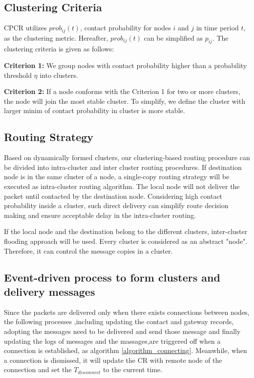 \subsection{Clustering Criteria}
CPCR utilizes $prob_{ij}(t)$, contact probability for nodes $i$ and $j$ in time period $t$, as the clustering metric. Hereafter, $prob_{ij}(t)$ can be simplified as $p_{ij}$. The clustering criteria is given as follows:

  \textbf{Criterion 1:} We group nodes with contact probability higher than a probability threshold $\eta$ into clusters.

  \textbf{Criterion 2:} If a node conforms with the Criterion 1 for two or more clusters, the node will join the most stable cluster. To simplify, we define the cluster with larger minim of contact probability in cluster is more stable.

\subsection{Routing Strategy}

Based on dynamically formed clusters, our clustering-based routing procedure can be divided into intra-cluster and inter cluster routing procedures. If destination node is in the same cluster of a node, a single-copy routing strategy will be executed as intra-cluster routing algorithm. The local node will not deliver the packet until contacted by the destination node. Considering high contact probability inside a cluster, such direct delivery can simplify route decision making and ensure acceptable delay in the intra-cluster routing.

If the local node and the destination belong to the different clusters, inter-cluster flooding approach will be used. Every cluster is considered as an abstract "node". Therefore, it can control the message copies in a cluster.

\subsection{Event-driven process to form clusters and delivery messages}

Since the packets are delivered only when there exists connections between nodes, the following processes ,including updating the contact and gateway records, adopting the messages need to be delivered and send those message and finally updating the logs of messages and the massages,are triggered off when a connection is established, as algorithm \ref{algorithm_connecting}. Meanwhile, when a connection is dismissed, it will update the CR with remote node of the connection and set the $T_{disconnect}$ to the current time.


